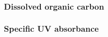 \documentclass[12pt,a4paper]{scrartcl}
\begin{document}



\clearpage
\newpage

\subsubsection*{Dissolved organic carbon}



\clearpage
\newpage

\subsubsection*{Specific UV absorbance}


\end{document}
